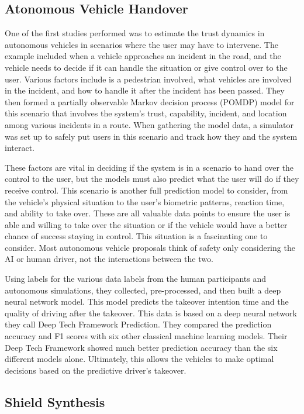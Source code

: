 \documentclass[journal,onecolumn]{IEEEtran}
\begin{document}
\subsection{Atonomous Vehicle Handover}

One of the first studies performed was to estimate the trust dynamics in autonomous vehicles in scenarios where the user may have to intervene. The example included when a vehicle approaches an incident in the road, and the vehicle needs to decide if it can handle the situation or give control over to the user. Various factors include is a pedestrian involved, what vehicles are involved in the incident, and how to handle it after the incident has been passed. They then formed a partially observable Markov decision process (POMDP) model for this scenario that involves the system's trust, capability, incident, and location among various incidents in a route. When gathering the model data, a simulator was set up to safely put users in this scenario and track how they and the system interact. 

These factors are vital in deciding if the system is in a scenario to hand over the control to the user, but the models must also predict what the user will do if they receive control. This scenario is another full prediction model to consider, from the vehicle's physical situation to the user's biometric patterns, reaction time, and ability to take over. These are all valuable data points to ensure the user is able and willing to take over the situation or if the vehicle would have a better chance of success staying in control. This situation is a fascinating one to consider. Most autonomous vehicle proposals think of safety only considering the AI or human driver, not the interactions between the two. 

Using labels for the various data labels from the human participants and autonomous simulations, they collected, pre-processed, and then built a deep neural network model. This model predicts the takeover intention time and the quality of driving after the takeover. This data is based on a deep neural network they call Deep Tech Framework Prediction. They compared the prediction accuracy and F1 scores with six other classical machine learning models. Their Deep Tech Framework showed much better prediction accuracy than the six different models alone. Ultimately, this allows the vehicles to make optimal decisions based on the predictive driver's takeover.

\subsection{Shield Synthesis}
\end{document}
